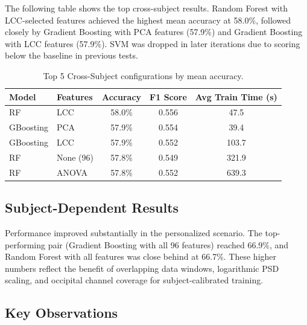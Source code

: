 \documentclass[12pt]{article}
\begin{document}
The following table shows the top cross-subject results. Random Forest with LCC-selected features achieved the highest mean accuracy at 58.0\%, followed closely by Gradient Boosting with PCA features (57.9\%) and Gradient Boosting with LCC features (57.9\%). SVM was dropped in later iterations due to scoring below the baseline in previous tests.

\begin{table}[H]
\centering
\caption{Top 5 Cross-Subject configurations by mean accuracy.}
\label{tab:cross}
\begin{tabular}{llccc}
\toprule
Model & Features & Accuracy & F1 Score & Avg Train Time (s) \\
\midrule
RF & LCC & 58.0\% & 0.556 & 47.5 \\
GBoosting & PCA & 57.9\% & 0.554 & 39.4 \\
GBoosting & LCC & 57.9\% & 0.552 & 103.7 \\
RF & None (96) & 57.8\% & 0.549 & 321.9 \\
RF & ANOVA & 57.8\% & 0.552 & 639.3 \\
\bottomrule
\end{tabular}
\end{table}

\subsection{Subject-Dependent Results}

Performance improved substantially in the personalized scenario. The top-performing pair (Gradient Boosting with all 96 features) reached 66.9\%, and Random Forest with all features was close behind at 66.7\%. These higher numbers reflect the benefit of overlapping data windows, logarithmic PSD scaling, and occipital channel coverage for subject-calibrated training.

\subsection{Key Observations}
\end{document}
